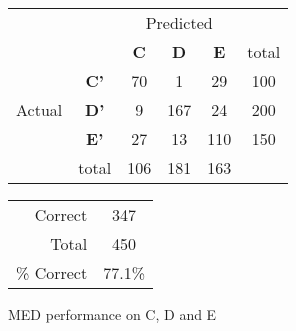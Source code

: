 \begin{figure}[ht]
\begin{minipage}[b]{0.5\linewidth}
\centering
	\begin{tabular}{ccc|c|c|c}
	 & &\multicolumn{3}{c}{Predicted} &\\
	  & & \bf{C} &  \bf{D} & \bf{E} & total \\
	 \cline{3-5}
	 \multirow{3}{*}{\begin{sideways}Actual\end{sideways}} & \bf{C'}& 70 & 1 & 29 & 100\\
	 \cline{3-6}
	 & \bf{D'}& 9 & 167 & 24 & 200\\
	  \cline{3-6}
	 & \bf{E'}& 27 & 13 & 110 &  150\\
	  \cline{3-6}
	 &total&106&181&163\\
	\end{tabular}
\end{minipage}
\hspace{0.5cm}
\begin{minipage}[b]{0.5\linewidth}
	\begin{tabular}{r|c}
	\hline
	Correct& 347\\
	Total& 450\\
	\hline
	\% Correct& 77.1\%\\
	\hline
	\end{tabular}
\end{minipage}
\vspace{1mm}
\caption{MED performance on C, D and E}
\end{figure}



